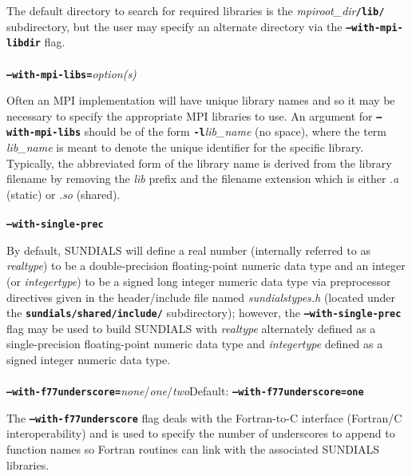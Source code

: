 The default directory to search for required libraries is the \textit{mpiroot\_dir}\texttt{\textbf{/lib/}} subdirectory, but the user may specify an alternate directory via the \texttt{\textbf{--with-mpi-libdir}} flag.
\\
\\ 
\texttt{\textbf{--with-mpi-libs=}}\textit{option(s)}\vspace{0.05in}

Often an MPI implementation will have unique library names and so it may be necessary to specify the appropriate \small MPI \normalsize libraries to use.  An argument for \texttt{\textbf{--with-mpi-libs}} should be of the form \texttt{\textbf{-l}}\textit{lib\_name} (no space), where the term \textit{lib\_name} is meant to denote the unique identifier for the specific library.  Typically, the abbreviated form of the library name is derived from the library filename by removing the \textit{lib} prefix and the filename extension which is either .\textit{a} (static) or .\textit{so} (shared).
\\
\\
\texttt{\textbf{--with-single-prec}}\vspace{0.05in}

By default, \small SUNDIALS \normalsize will define a real number (internally referred to as \textit{realtype}) to be a double-precision floating-point numeric data type and an integer (or \textit{integertype}) to be a signed long integer numeric data type via preprocessor directives given in the header/include file named \textit{sundialstypes.h} (located under the \texttt{\textbf{sundials/shared/include/}} subdirectory); however, the \texttt{\textbf{--with-single-prec}} flag may be used to build \small SUNDIALS \normalsize with \textit{realtype} alternately defined as a single-precision floating-point numeric data type and \textit{integertype} defined as a signed integer numeric data type.
\\
\\
\texttt{\textbf{--with-f77underscore=}}\textit{none}/\textit{one}/\textit{two}\hspace{0.5in}Default: \texttt{\textbf{--with-f77underscore=one}}\vspace{0.05in}

The \texttt{\textbf{--with-f77underscore}} flag deals with the Fortran-to-C interface (Fortran/C interoperability) and is used to specify the number of underscores to append to function names so Fortran routines can link with the associated \small SUNDIALS \normalsize libraries.

